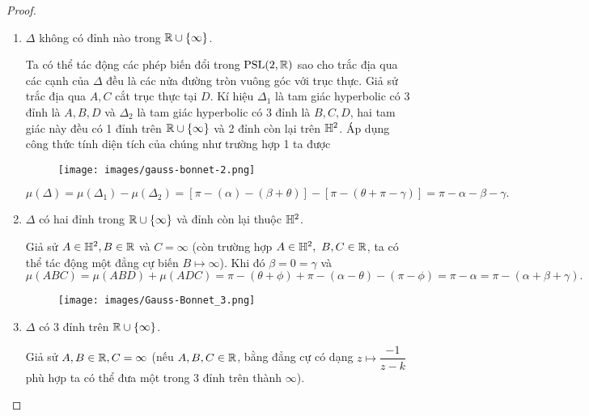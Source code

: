 \begin{proof}
\begin{enumerate}
        \item $\Delta$ không có đỉnh nào trong $\mathbb{R} \cup \{\infty\}$.

        Ta có thể tác động các phép biến đổi trong $\operatorname{PSL}(2,\mathbb{R})$ sao cho trắc địa qua các cạnh của $\Delta$ đều là các nửa đường tròn vuông góc với trục thực. Giả sử trắc địa qua $A,C$ cắt trục thực tại $D$. Kí hiệu $\Delta_1$ là tam giác hyperbolic có 3 đỉnh là $A,B,D$ và $\Delta_2$ là tam giác hyperbolic có 3 đỉnh là $B,C,D$, hai tam giác này đều có 1 đỉnh trên $\mathbb{R}\cup\{\infty\}$ và 2 đỉnh còn lại trên $\mathbb{H}^2$. Áp dụng công thức tính diện tích của chúng như trường hợp 1 ta được
        \begin{figure}
            \centering
            \texttt{[image: images/gauss-bonnet-2.png]}
        \end{figure}
        \[\mu(\Delta) = \mu(\Delta_1) -\mu(\Delta_2) = [\pi - (\alpha)-(\beta + \theta)] - [\pi - (\theta + \pi -\gamma)] = \pi -\alpha - \beta -\gamma.\]
        
        \item $\Delta$ có hai đỉnh trong $\mathbb{R} \cup \{\infty\}$ và đỉnh còn lại thuộc $\mathbb{H}^2$.
    
        Giả sử $A \in \mathbb{H}^2, B \in \mathbb{R}$ và $C = \infty$ (còn trường hợp $A \in \mathbb{H}^2,~B,C \in \mathbb{R}$, ta có thể tác động một đẳng cự biến $B\mapsto \infty$). Khi đó $\beta =0 = \gamma$ và 
        \[\mu(ABC) = \mu(ABD) + \mu(ADC) = \pi-(\theta+\phi) + \pi -(\alpha - \theta) - (\pi-\phi) = \pi - \alpha = \pi-(\alpha + \beta + \gamma).\]

        \begin{figure}[htp!]
        \centering
        \texttt{[image: images/Gauss-Bonnet\_3.png]}
        \end{figure}
    \item $\Delta$ có 3 đỉnh trên $\mathbb{R} \cup \{\infty\}$.

        Giả sử $A,B \in \mathbb{R}, C = \infty$ (nếu $A,B,C \in \mathbb{R}$, bằng đẳng cự có dạng $z \mapsto \dfrac{-1}{z-k}$ phù hợp ta có thể đưa một trong 3 đỉnh trên thành $\infty$).
        

\end{enumerate}
\end{proof}
